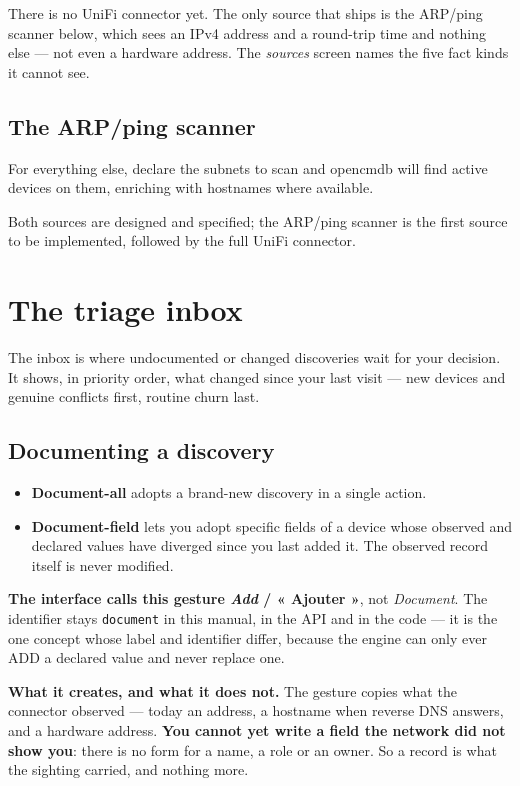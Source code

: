 \documentclass[11pt,oneside,listof=totoc,bibliography=totoc]{scrreprt}
\begin{document}
\begin{planned}
There is no UniFi connector yet. The only source that ships is the ARP/ping scanner below,
which sees an IPv4 address and a round-trip time and nothing else --- not even a hardware
address. The \emph{sources} screen names the five fact kinds it cannot see.
\end{planned}

\section{The ARP/ping scanner}
For everything else, declare the subnets to scan and opencmdb will find active devices on
them, enriching with hostnames where available.

\begin{planned}
Both sources are designed and specified; the ARP/ping scanner is the first source to be
implemented, followed by the full UniFi connector.
\end{planned}

\chapter{The triage inbox}
The inbox is where undocumented or changed discoveries wait for your decision. It shows, in
priority order, what changed since your last visit — new devices and genuine conflicts
first, routine churn last.

\section{Documenting a discovery}
\begin{itemize}
  \item \textbf{Document-all} adopts a brand-new discovery in a single action.
  \item \textbf{Document-field} lets you adopt specific fields of a device whose observed and
        declared values have diverged since you last added it. The observed record itself is
        never modified.
\end{itemize}

\textbf{The interface calls this gesture \emph{Add} / « Ajouter »}, not \emph{Document}. The
identifier stays \texttt{document} in this manual, in the API and in the code --- it is the one
concept whose label and identifier differ, because the engine can only ever ADD a declared value
and never replace one.

\textbf{What it creates, and what it does not.} The gesture copies what the connector observed
--- today an address, a hostname when reverse DNS answers, and a hardware address. \textbf{You
cannot yet write a field the network did not show you}: there is no form for a name, a role or an
owner. So a record is what the sighting carried, and nothing more.
\end{document}
